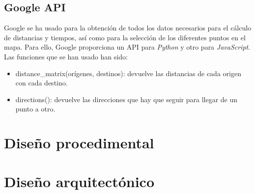 \subsection{Google API}
Google se ha usado para la obtención de todos los datos necesarios para el cálculo de distancias y tiempos, así como para la selección de los diferentes puntos en el mapa. Para ello, Google proporciona un API para \textit{Python} y otro para \textit{JavaScript}. Las funciones que se han usado han sido:
\begin{itemize}
	\item distance\_matrix(orígenes, destinos): devuelve las distancias de cada origen con cada destino.
	\item directions(): devuelve las direcciones que hay que seguir para llegar de un punto a otro.
\end{itemize}


\section{Diseño procedimental}


\section{Diseño arquitectónico}


